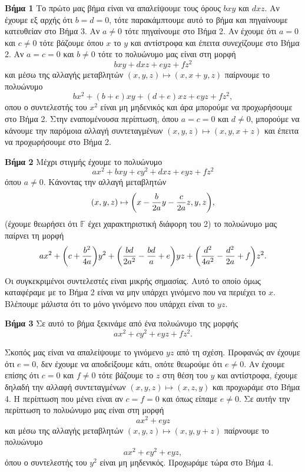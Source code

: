 \documentclass[12pt, a4paper]{book}
\begin{document}
\textbf{Bήμα 1} Το πρώτο μας βήμα είναι να απαλείψουμε τους όρους $bxy$ και $dxz$. Αν έχουμε εξ αρχής ότι $b=d=0$, τότε παρακάμπτουμε αυτό το βήμα και πηγαίνουμε κατευθείαν στο Bήμα 3. Αν $a \neq 0$ τότε πηγαίνουμε στο Bήμα 2. Αν έχουμε ότι $a = 0$ και $c \neq 0$ τότε βάζουμε όπου $x$ το $y$ και αντίστροφα και έπειτα συνεχίζουμε στο Bήμα 2. Αν $a=c=0$ και $b \neq 0$ τότε το πολυώνυμο μας είναι στη μορφή
\begin{displaymath}
bxy+dxz+eyz+fz^2
\end{displaymath}
και μέσω της αλλαγής μεταβλητών $(x,y,z) \mapsto (x,x+y,z)$ παίρνουμε το πολυώνυμο 
\begin{displaymath}
bx^2+(b+e)xy+(d+e)xz+eyz+fz^2,
\end{displaymath}
οπου ο συντελεστής του $x^2$ είναι μη μηδενικός και άρα μπορούμε να προχωρήσουμε στο Βήμα 2. Στην εναπομένουσα περίπτωση, όπου $a=c=0 $ και $d \neq 0$, μπορούμε να κάνουμε την παρόμοια αλλαγή συντεταγμένων $(x,y,z) \mapsto (x,y,x+z)$ και έπειτα να προχωρήσουμε στο Βήμα 2.

\textbf{Βήμα 2} Μέχρι στιγμής έχουμε το πολυώνυμο
\begin{displaymath}
ax^2+bxy+cy^2+dxz+eyz+fz^2
\end{displaymath}
όπου $a \neq 0$. Κάνοντας την αλλαγή μεταβλητών
\begin{displaymath}
(x,y,z) \mapsto \bigg{(}x - \frac{b}{2a}y - \frac{c}{2a}z,y,z\bigg{)},
\end{displaymath}
(έχουμε θεωρήσει ότι $\mathbb{F}$ έχει χαρακτηριστική διάφορη του 2)  το πολυώνυμο μας παίρνει τη μορφή
\begin{displaymath}
ax^2+\bigg{(}c+\frac{b^2}{4a}\bigg{)}y^2+\bigg{(}\frac{bd}{2a^2}-\frac{bd}{a}+e\bigg{)}yz+\bigg{(}\frac{d^2}{4a^2}-\frac{d^2}{2a}+f\bigg{)}z^2.
\end{displaymath}

Οι συγκεκριμένοι συντελεστές είναι μικρής σημασίας. Αυτό το οποίο όμως καταφέραμε με το Βήμα 2 είναι να μην υπάρχει γινόμενο που να περιέχει το $x$. Βλέπουμε μάλιστα ότι το μόνο γινόμενο που υπάρχει είναι το $yz$.

\textbf{Βήμα 3} Σε αυτό το βήμα ξεκινάμε από ένα πολυώνυμο της μορφής
\begin{displaymath}
ax^2+cy^2+eyz+fz^2.
\end{displaymath}

Σκοπός μας είναι να απαλείψουμε το γινόμενο $yz$ από τη σχέση. Προφανώς αν έχουμε ότι $e = 0$, δεν έχουμε να αποδείξουμε κάτι, οπότε θεωρούμε ότι $e \neq 0$. Αν έχουμε επίσης ότι $c = 0$ και $f \neq 0$ τότε βάζουμε το $z$ στη θέση του $y$ και αντίστροφα, έχουμε δηλαδή την αλλαφή συντεταγμένων $(x,y,z) \mapsto (x,z,y)$ και προχωράμε στο Βήμα 4. Η περίπτωση που μένει είναι αν $c=f=0$ και όπως είπαμε $e \neq 0$. Σε αυτήν την περίπτωση το πολυώνυμο μας είναι στη μορφή
\begin{displaymath}
ax^2 + eyz
\end{displaymath}
και μέσω της αλλαγής μεταβλητών $(x,y,z) \mapsto (x,y,y+z)$ παίρνουμε το πολυώνυμο
\begin{displaymath}
ax^2 + ey^2+eyz,
\end{displaymath}
όπου ο συντελεστής του $y^2$ είναι μη μηδενικός. Προχωράμε τώρα στο Βήμα 4.
\end{document}
